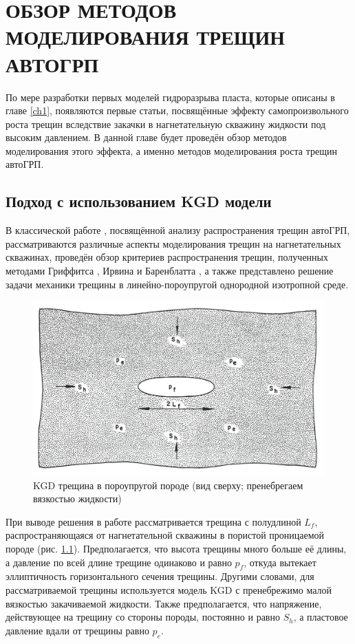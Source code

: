 \chapter{ОБЗОР МЕТОДОВ МОДЕЛИРОВАНИЯ ТРЕЩИН АВТОГРП} \label{ch2}

По мере разработки первых моделей гидроразрыва пласта, которые описаны в главе \ref{ch1}, появляются первые статьи, посвящённые эффекту самопроизвольного роста трещин вследствие закачки в нагнетательную скважину жидкости под высоким давлением.
В данной главе будет проведён обзор методов моделирования этого эффекта, а именно методов моделирования роста трещин автоГРП.

\section{Подход с использованием KGD модели}
\vspace*{-5mm}

В классической работе \cite{hagoort_phd}, посвящённой анализу распространения трещин автоГРП, рассматриваются различные аспекты моделирования трещин на нагнетательных скважинах, проведён обзор критериев распространения трещин, полученных методами Гриффитса \cite{griffith}, Ирвина \cite{irwin} и Баренблатта \cite{barenblatt}, а также представлено решение задачи механики трещины в линейно-пороупругой однородной изотропной среде.

\begin{figure}[H] 
\center
\includegraphics[width=.55\linewidth]{images/Hagoort_model_scheme.jpg}
\caption{KGD трещина в пороупругой породе \cite{hagoort_phd} (вид сверху; пренебрегаем вязкостью жидкости)} 
\label{fig:hagoort_model_scheme}  
\end{figure}

При выводе решения в работе \cite{hagoort_phd} рассматривается трещина с полудлиной $L_{\!f}$, распространяющаяся от нагнетательной скважины в пористой проницаемой породе (рис. \ref{fig:hagoort_model_scheme}).
Предполагается, что высота трещины много больше её длины, а давление по всей длине трещине одинаково и равно $p_{\!f}$, откуда вытекает эллиптичность горизонтального сечения трещины.
Другими словами, для рассматриваемой трещины используется модель KGD с пренебрежимо малой вязкостью закачиваемой жидкости.
Также предполагается, что напряжение, действующее на трещину со стороны породы, постоянно и равно $S_h$, а пластовое давление вдали от трещины равно $p_e$.

